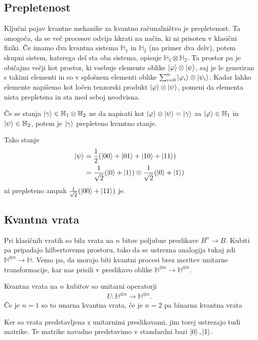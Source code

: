 \documentclass[mat1]{fmfdelo}
\newcommand{\Hb}{\mathbb H}
\begin{document}
\subsection{Prepletenost}
Ključni pojav kvantne mehanike za kvantno računalništvo je prepletenost. Ta omogoča, da se več procesov odvija hkrati na način, ki ni prisoten v klasični fiziki. Če imamo dva kvantna sistema \(\Hb_1\) in \(\Hb_2\) (na primer dva delv), potem skupni sistem, katerega del sta oba sistema, opisuje \(\Hb_1\otimes\Hb_2\). Ta prostor pa je običajno večji kot prostor, ki vsebuje elemente oblike \(\ket\varphi\otimes\ket\psi\), saj je le generiran s takimi elementi in so v splošnem elementi oblike \(\sum_{i=0}^n\ket{\varphi_i}\otimes\ket{\psi_i}\). Kadar lahko elemente napišemo kot ločen tenzorski produkt \(\ket\varphi\otimes\ket\psi\), pomeni da elementa nista prepletena in sta med seboj neodvisna.
\begin{definicija}
    Če se stanja \(\ket\gamma\in \Hb_1\otimes\Hb_2\) ne da napisati kot \(\ket\varphi\otimes\ket\psi = \ket\gamma\) za \(\ket\varphi\in\Hb_1\) in \(\ket\psi\in\Hb_2\), potem je \(\ket\gamma\) prepleteno kvantno stanje.
\end{definicija}
Tako stanje
\begin{align*}
    \ket\psi &=  \frac12(\ket{00}+\ket{01}+\ket{10}+\ket{11})\\
    &= \frac{1}{\sqrt2}(\ket0+\ket1) \otimes \frac{1}{\sqrt2}(\ket0+\ket1) 
\end{align*}
ni prepleteno ampak \(\frac{1}{\sqrt2}(\ket{00}+\ket{11})\) je.
\subsection{Kvantna vrata} Pri klasičnih vratih so bila vrata na \(n\) bitov poljubne preslikave \(B^n\to B\). Kubiti pa pripadajo hilbertovemu prostoru, tako da se ustrezna analogija tukaj zdi \(\Hb^{\otimes n}\to \Hb\). Vemo pa, da morajo biti kvantni procesi brez meritev unitarne transformacije, kar nas prisili v preslikavo oblike \(\Hb^{\otimes n}\to \Hb^{\otimes n}\).
\begin{definicija}
    Kvantna vrata na \(n\) kubitov so unitarni operatorji
    \begin{align*}
        U:\Hb^{\otimes n}\to \Hb^{\otimes n}.
    \end{align*}
    Če je \(n=1\) so to unarna kvantna vrata, če je \(n=2\) pa binarna kvantna vrata \cite[Definicija 5.7]{mathforqm}
\end{definicija}
Ker so vrata predstavljena z unitarnimi preslikavami, jim torej ustrezajo tudi matrike. Te matrike navadno predstavimo v standardni bazi \(\ket0, \ket1\).
\end{document}
